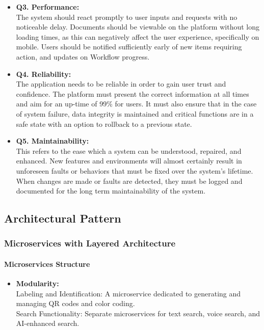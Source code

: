 \documentclass[hidelinks, 12pt, a4paper]{article}
\begin{document}
\begin{itemize}
\begin{itemize}
        \item \textbf{Q3. Performance: }\\
        The system should react promptly to user inputs and requests with no noticeable delay. Documents should be viewable on the platform without long loading times, as this can negatively affect the user experience, specifically on mobile. Users should be notified sufficiently early of new items requiring action, and updates on
        Workflow progress.\\

        \item \textbf{Q4. Reliability: }\\
        The application needs to be reliable in order to gain user trust and confidence. The platform must present the correct information at all times and aim for an up-time of 99\% for users. It must also ensure that in the case of system failure, data integrity is maintained and critical functions are in a safe state with an option to rollback to a previous state.\\

        \item \textbf{Q5. Maintainability: }\\
        This refers to the ease which a system can be understood, repaired, and enhanced. New features and environments will almost certainly result in unforeseen faults or behaviors that must be fixed over the system's lifetime. When changes are made or faults are detected, they must be logged and documented for the long term maintainability of the system.
    \end{itemize}
    \subsection{Architectural Pattern}
    \subsubsection{Microservices with Layered Architecture}
    \paragraph{Microservices Structure}
    \begin{itemize}
        \item \textbf{Modularity: }\\
        Labeling and Identification: A microservice dedicated to generating and managing QR codes and color coding.\\
        Search Functionality: Separate microservices for text search, voice search, and AI-enhanced search.


\end{itemize}
\end{itemize}
\end{document}
